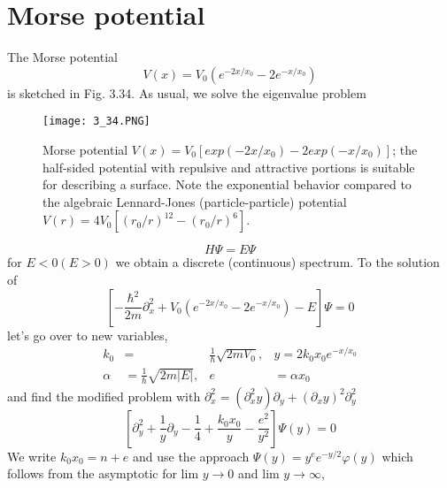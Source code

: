\section{Morse potential}
The Morse potential
\begin{equation}
    V(x)=V_{0}\left(e^{-2 x / x_{0}}-2 e^{-x / x_{0}}\right)
    \end{equation}
is sketched in Fig. 3.34. As usual, we solve the eigenvalue problem
\begin{figure}[ht]
    \begin{minipage}{0.5\textwidth}
        \centering
        \texttt{[image: 3\_34.PNG]}
    \end{minipage}
    \begin{minipage}{0.5\textwidth}
        \caption{Morse potential $V (x) = V_0 [exp (-2x / x_0) - 2 exp (-x / x_0)]$; the half-sided potential with repulsive and attractive portions is suitable for describing a surface. Note the exponential behavior compared to the algebraic Lennard-Jones (particle-particle) potential $V(r)=4V_0[(r_0/r)^{12}-(r_0/r)^6]$.}
    \end{minipage}
\end{figure}
\begin{equation}
    H \Psi=E \Psi
    \end{equation}
for $E <0 (E> 0)$ we obtain a discrete (continuous) spectrum. To the solution of
\begin{equation}
    \left[-\frac{\hbar^{2}}{2 m} \partial_{x}^{2}+V_{0}\left(e^{-2 x / x_{0}}-2 e^{-x / x_{0}}\right)-E\right] \Psi=0
    \end{equation}
let's go over to new variables,
\begin{equation}
\begin{aligned} k_{0} &=& \frac{1}{\hbar} \sqrt{2 m V_{0}}, & y=2 k_{0} x_{0} e^{-x / x_{0}} \\ \alpha &=\frac{1}{\hbar} \sqrt{2 m|E|}, & e &=\alpha x_{0} \end{aligned}
\end{equation}
and find the modified problem with $\partial_x^2=(\partial_x^2y)\partial_y+(\partial_xy)^2\partial_y^2$
\begin{equation}
    \left[\partial_{y}^{2}+\frac{1}{y} \partial_{y}-\frac{1}{4}+\frac{k_{0} x_{0}}{y}-\frac{e^{2}}{y^{2}}\right] \Psi(y)=0
    \end{equation}
We write $k_0x_0 = n + e$ and use the approach $\Psi (y) = y^ee^{-y/2} \varphi(y)$ which follows from the asymptotic for lim $y \to 0$ and lim $y \to\infty$,
